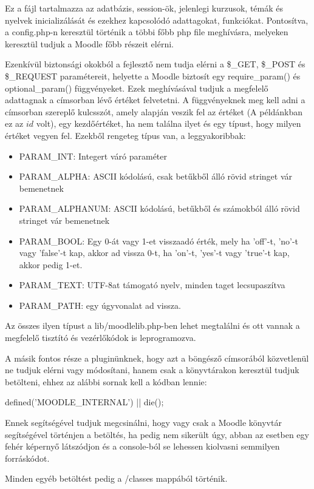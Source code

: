 Ez a fájl tartalmazza az adatbázis, session-ök, jelenlegi kurzusok, témák és nyelvek inicializálását és ezekhez kapcsolódó adattagokat, funkciókat. Pontosítva, a config.php-n keresztül történik a többi főbb php file meghívásra, melyeken keresztül tudjuk a Moodle főbb részeit elérni. \par

Ezenkívül biztonsági okokból a fejlesztő nem tudja elérni a \$\_GET,  \$\_POST és  \$\_REQUEST paramétereit, helyette a Moodle biztosít egy require\_param() és optional\_param() függvényeket. Ezek meghívásával tudjuk a megfelelő adattagnak a címsorban lévő értéket felvetetni. A függvényeknek meg kell adni a címsorban szereplő kulcsszót, amely alapján veszik fel az értéket (A példánkban ez az $id$ volt), egy kezdőértéket, ha nem találna ilyet és egy típust, hogy milyen értéket vegyen fel. Ezekből rengeteg típus van, a leggyakoribbak:

\begin{itemize}
    \item PARAM\_INT: Integert váró paraméter
    \item PARAM\_ALPHA: ASCII kódolású, csak betűkből álló rövid stringet vár bemenetnek
    \item PARAM\_ALPHANUM: ASCII kódolású, betűkből és számokból álló rövid stringet vár bemenetnek
    \item PARAM\_BOOL: Egy 0-át vagy 1-et visszaadó érték, mely ha 'off'-t, 'no'-t vagy 'false'-t kap, akkor ad vissza 0-t, ha 'on'-t, 'yes'-t vagy 'true'-t kap, akkor pedig 1-et.
    \item PARAM\_TEXT: UTF-8at támogató nyelv, minden taget lecsupaszítva
    \item PARAM\_PATH: egy úgyvonalat ad vissza.
\end{itemize}

Az összes ilyen típust a lib/moodlelib.php-ben lehet megtalálni és ott vannak a megfelelő tisztító és vezérlőkódok is leprogramozva.

A másik fontos része a pluginünknek, hogy azt a böngésző címsorából közvetlenül ne tudjuk elérni vagy módosítani, hanem csak a könyvtárakon keresztül tudjuk betölteni, ehhez az alábbi sornak kell a kódban lennie: \par
\hfill \break
defined('MOODLE\_INTERNAL') || die();
\hfill \break

Ennek segítségével tudjuk megcsinálni, hogy vagy csak a Moodle könyvtár segítségével történjen a betöltés, ha pedig nem sikerült úgy, abban az esetben egy fehér képernyő látszódjon és a console-ból se lehessen kiolvasni semmilyen forráskódot. \par
Minden egyéb betöltést pedig a /classes mappából történik. 

